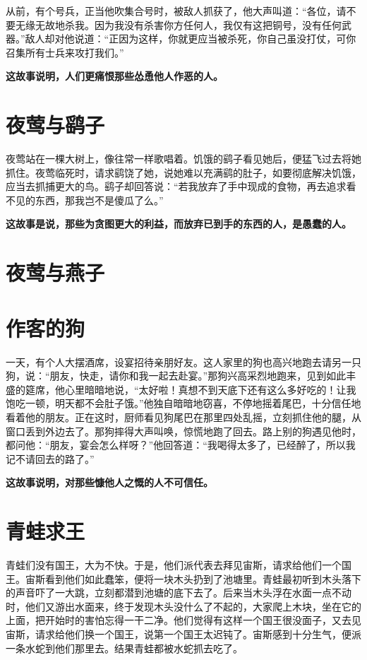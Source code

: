 从前，有个号兵，正当他吹集合号时，被敌人抓获了，他大声叫道：“各位，请不要无缘无故地杀我。因为我没有杀害你方任何人，我仅有这把铜号，没有任何武器。”敌人却对他说道：“正因为这样，你就更应当被杀死，你自己虽没打仗，可你召集所有士兵来攻打我们。”

{\bfseries \color{red}这故事说明，人们更痛恨那些怂恿他人作恶的人。}

\section{夜莺与鹞子}

夜莺站在一棵大树上，像往常一样歌唱着。饥饿的鹞子看见她后，便猛飞过去将她抓住。夜莺临死时，请求鹞饶了她，说她难以充满鹞的肚子，如要彻底解决饥饿，应当去抓捕更大的鸟。鹞子却回答说：“若我放弃了手中现成的食物，再去追求看不见的东西，那我岂不是傻瓜了么。”

{\bfseries \color{red}这故事是说，那些为贪图更大的利益，而放弃已到手的东西的人，是愚蠢的人。}

\section{夜莺与燕子}



{\bfseries \color{red}}

\section{作客的狗}

一天，有个人大摆酒席，设宴招待亲朋好友。这人家里的狗也高兴地跑去请另一只狗，说：“朋友，快走，请你和我一起去赴宴。”那狗兴高采烈地跑来，见到如此丰盛的筵席，他心里暗暗地说，“太好啦！真想不到天底下还有这么多好吃的！让我饱吃一顿，明天都不会肚子饿。”他独自暗暗地窃喜，不停地摇着尾巴，十分信任地看着他的朋友。正在这时，厨师看见狗尾巴在那里四处乱摇，立刻抓住他的腿，从窗口丢到外边去了。那狗摔得大声叫唤，惊慌地跑了回去。路上别的狗遇见他时，都问他：“朋友，宴会怎么样呀？”他回答道：“我喝得太多了，已经醉了，所以我记不请回去的路了。”

{\bfseries \color{red}这故事说明，对那些慷他人之慨的人不可信任。}

\section{青蛙求王}

青蛙们没有国王，大为不快。于是，他们派代表去拜见宙斯，请求给他们一个国王。宙斯看到他们如此蠢笨，便将一块木头扔到了池塘里。青蛙最初听到木头落下的声音吓了一大跳，立刻都潜到池塘的底下去了。后来当木头浮在水面一点不动时，他们又游出水面来，终于发现木头没什么了不起的，大家爬上木块，坐在它的上面，把开始时的害怕忘得一干二净。他们觉得有这样一个国王很没面子，又去见宙斯，请求给他们换一个国王，说第一个国王太迟钝了。宙斯感到十分生气，便派一条水蛇到他们那里去。结果青蛙都被水蛇抓去吃了。

